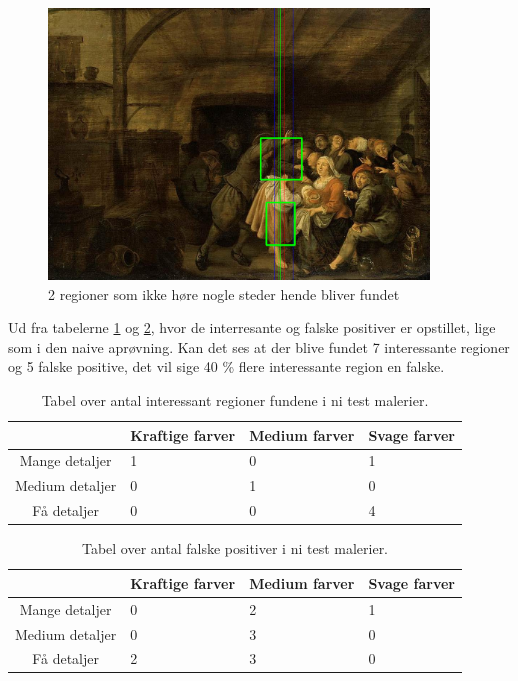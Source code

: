 \begin{figure}[h!!]
	\begin{center}
		\includegraphics[width=0.9\textwidth,angle=0]{afsnit/afprovning/billeder/udvidet_losning/udvidet_sfarver_mdetaljer.png}
	\end{center}
	\caption[]{2 regioner som ikke høre nogle steder hende bliver fundet}
	\label{udvidet_virker_ikke3}
\end{figure}


Ud fra tabelerne \ref{udvidet_good} og \ref{udvidet_bad}, hvor de
interresante og falske positiver er opstillet, lige som i den naive
aprøvning. Kan det ses at der blive fundet 7 interessante regioner og 5
falske positive, det vil sige 40 \% flere interessante region en falske.

\begin{table}[H]
    \centering
    \begin{tabular}{|c|l|l|l|}
	\hline
           				& Kraftige farver & Medium farver & Svage farver \\\hline
		Mange detaljer	& 1 & 0 & 1 \\\hline
        Medium detaljer & 0 & 1 & 0 \\\hline
        Få detaljer     & 0 & 0 & 4 \\\hline
    \end{tabular}
    \caption[]{Tabel over antal interessant regioner fundene i ni test malerier.}
    \label{udvidet_good}
\end{table}

\begin{table}[H]
    \centering
    \begin{tabular}{|c|l|l|l|}
		\hline
            & Kraftige farver & Medium farver & Svage farver \\\hline
		Mange detaljer	& 0 & 2 & 1 \\\hline
        Medium detaljer  & 0 & 3 & 0 \\\hline
        Få detaljer     & 2 & 3 & 0 \\\hline
    \end{tabular}
    \caption[]{Tabel over antal falske positiver i ni test malerier.}
    \label{udvidet_bad}
\end{table}
\clearpage


